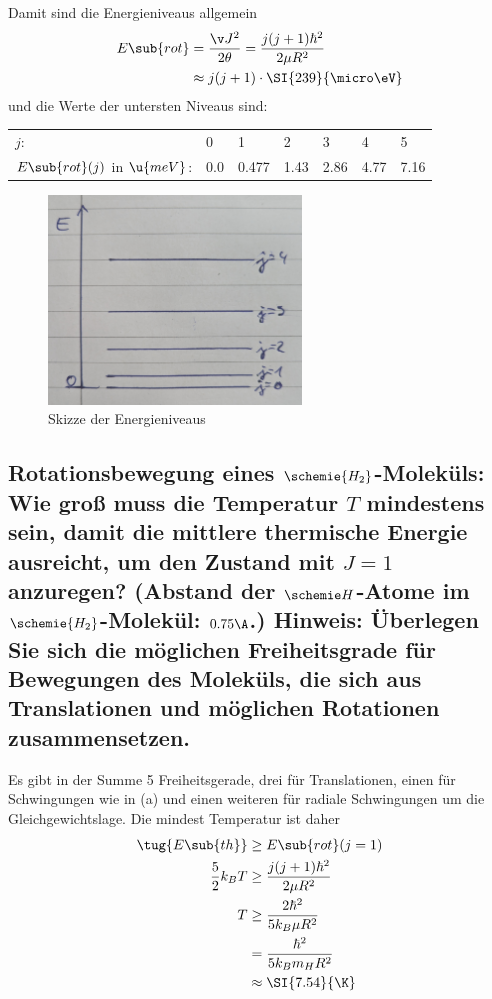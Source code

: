 \documentclass[ex]{exercise_4.1}
\begin{document}
Damit sind die Energieniveaus allgemein 
\begin{align*}
    E\sub{rot} 
    &= \frac{\v J^2}{2\theta}
    = \frac{j(j+1) \hbar^2}{2\mu R^2}\\
    &\approx j(j+1)\cdot \SI{239}{\micro\eV}\\
\end{align*}
und die Werte der untersten Niveaus sind:

\begin{center}
    \begin{tabular}{@{}lllllll@{}}
        \toprule
        \(j\): & 0&1&2&3&4&5\\
        $E\sub{rot}(j)$ in \(\u{meV}\):&0.0 & 0.477 & 1.43 & 2.86 & 4.77 & 7.16\\
        \bottomrule
    \end{tabular}
\end{center}

\begin{figure}[H]
    \centering
    \includegraphics[width=0.6\textwidth]{j_energieniveaus.jpg}
    \caption{Skizze der Energieniveaus}
\end{figure}

\subsection{Rotationsbewegung eines $\schemie{H_2}$-Moleküls: Wie groß muss die Temperatur $T$ mindestens sein, damit die mittlere thermische Energie ausreicht, um den Zustand mit $J = 1$ anzuregen? (Abstand der $\schemie H$-Atome im $\schemie{H_2}$-Molekül: $0.75\A$.) Hinweis: Überlegen Sie sich die möglichen Freiheitsgrade für Bewegungen des Moleküls, die sich aus Translationen und möglichen Rotationen zusammensetzen.}

\dottedlinett

Es gibt in der Summe 5 Freiheitsgerade, drei für Translationen, einen für Schwingungen wie in (a) und einen weiteren für radiale Schwingungen um die Gleichgewichtslage.
Die mindest Temperatur ist daher 
\begin{align*}
    \tug{E\sub{th}} &\ge E\sub{rot}(j=1)\\
    \frac 52 k_B T &\ge \frac{j(j+1) \hbar^2}{2\mu R^2}\\
    T &\ge \frac{2\hbar^2}{5k_B \mu R^2}\\
    &= \frac{\hbar^2}{5k_B m_H R^2}\\
    &\approx \SI{7.54}{\K}
\end{align*}
\end{document}
